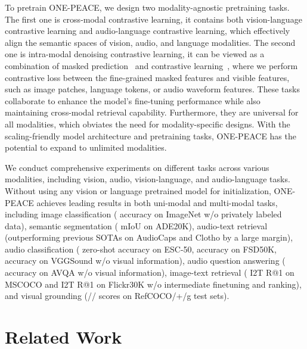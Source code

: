 \documentclass{article}
\newcommand{\onepeace}{ONE-PEACE\xspace}
\begin{document}
To pretrain \onepeace, we design two modality-agnostic pretraining tasks.
The first one is cross-modal contrastive learning, it contains both vision-language contrastive learning and audio-language contrastive learning, which effectively align the semantic spaces of vision, audio, and language modalities.
The second one is intra-modal denoising contrastive learning, it can be viewed as a combination of masked prediction~\cite{bert,beit,mae,wav2vec} and contrastive learning~\cite{clip,simclr,moco}, where we perform contrastive loss between the fine-grained masked features and visible features, such as image patches, language tokens, or audio waveform features.
These tasks collaborate to enhance the model's fine-tuning performance while also maintaining cross-modal retrieval capability.
Furthermore, they are universal for all modalities, which obviates the need for modality-specific designs.
With the scaling-friendly model architecture and pretraining tasks, \onepeace has the potential to expand to unlimited modalities.

We conduct comprehensive experiments on different tasks across various modalities, including vision, audio, vision-language, and audio-language tasks.
Without using any vision or language pretrained model for initialization, \onepeace achieves leading results in both uni-modal and multi-modal tasks, including image classification ( accuracy on ImageNet w/o privately labeled data), semantic segmentation ( mIoU on ADE20K), audio-text retrieval (outperforming previous SOTAs on AudioCaps and Clotho by a large margin), audio classification ( zero-shot accuracy on ESC-50,  accuracy on FSD50K,  accuracy on VGGSound w/o visual information), audio question answering ( accuracy on AVQA w/o visual information), image-text retrieval ( I2T R@1 on MSCOCO and  I2T R@1 on Flickr30K w/o intermediate finetuning and ranking), and visual grounding (// scores on RefCOCO/+/g test sets).







 \section{Related Work}
\label{sec:related-work}
\end{document}
